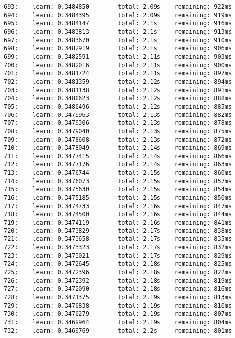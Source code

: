 \documentclass[11pt]{article}
\begin{document}
\begin{Verbatim}[commandchars=\\\{\}]
693:    learn: 0.3484850        total: 2.09s    remaining: 922ms
694:    learn: 0.3484395        total: 2.09s    remaining: 919ms
695:    learn: 0.3484147        total: 2.1s     remaining: 916ms
696:    learn: 0.3483813        total: 2.1s     remaining: 913ms
697:    learn: 0.3483670        total: 2.1s     remaining: 910ms
698:    learn: 0.3482919        total: 2.1s     remaining: 906ms
699:    learn: 0.3482591        total: 2.11s    remaining: 903ms
700:    learn: 0.3482016        total: 2.11s    remaining: 900ms
701:    learn: 0.3481724        total: 2.11s    remaining: 897ms
702:    learn: 0.3481359        total: 2.12s    remaining: 894ms
703:    learn: 0.3481138        total: 2.12s    remaining: 891ms
704:    learn: 0.3480623        total: 2.12s    remaining: 888ms
705:    learn: 0.3480496        total: 2.12s    remaining: 885ms
706:    learn: 0.3479963        total: 2.13s    remaining: 882ms
707:    learn: 0.3479306        total: 2.13s    remaining: 878ms
708:    learn: 0.3479040        total: 2.13s    remaining: 875ms
709:    learn: 0.3478608        total: 2.13s    remaining: 872ms
710:    learn: 0.3478049        total: 2.14s    remaining: 869ms
711:    learn: 0.3477415        total: 2.14s    remaining: 866ms
712:    learn: 0.3477176        total: 2.14s    remaining: 863ms
713:    learn: 0.3476744        total: 2.15s    remaining: 860ms
714:    learn: 0.3476073        total: 2.15s    remaining: 857ms
715:    learn: 0.3475630        total: 2.15s    remaining: 854ms
716:    learn: 0.3475185        total: 2.15s    remaining: 850ms
717:    learn: 0.3474733        total: 2.16s    remaining: 847ms
718:    learn: 0.3474500        total: 2.16s    remaining: 844ms
719:    learn: 0.3474119        total: 2.16s    remaining: 841ms
720:    learn: 0.3473829        total: 2.17s    remaining: 838ms
721:    learn: 0.3473658        total: 2.17s    remaining: 835ms
722:    learn: 0.3473323        total: 2.17s    remaining: 832ms
723:    learn: 0.3473021        total: 2.17s    remaining: 829ms
724:    learn: 0.3472645        total: 2.18s    remaining: 825ms
725:    learn: 0.3472396        total: 2.18s    remaining: 822ms
726:    learn: 0.3472392        total: 2.18s    remaining: 819ms
727:    learn: 0.3472090        total: 2.18s    remaining: 816ms
728:    learn: 0.3471375        total: 2.19s    remaining: 813ms
729:    learn: 0.3470838        total: 2.19s    remaining: 810ms
730:    learn: 0.3470279        total: 2.19s    remaining: 807ms
731:    learn: 0.3469964        total: 2.19s    remaining: 804ms
732:    learn: 0.3469769        total: 2.2s     remaining: 801ms

\end{Verbatim}
\end{document}
